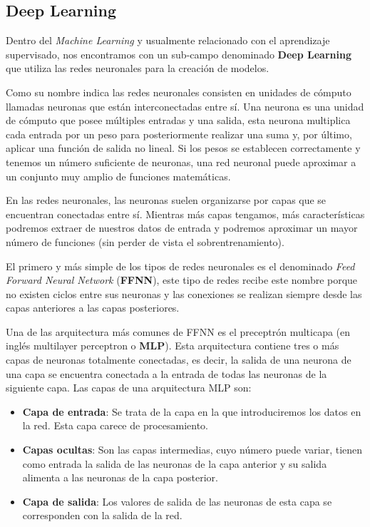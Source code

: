 \subsection{Deep Learning}
Dentro del \textit{Machine Learning} y usualmente relacionado con el aprendizaje supervisado, nos encontramos con un sub-campo denominado \textbf{Deep Learning} que utiliza las redes neuronales para la creación de modelos. 

Como su nombre indica las redes neuronales consisten en unidades de cómputo llamadas neuronas que están interconectadas entre sí. Una neurona es una unidad de cómputo que posee múltiples  entradas y una  salida, esta neurona multiplica cada entrada por un peso para posteriormente realizar una suma y, por último, aplicar una función de salida no lineal. Si los pesos se establecen correctamente y tenemos un número suficiente de neuronas, una red neuronal puede aproximar a un conjunto muy amplio de funciones matemáticas. 

En las redes neuronales, las neuronas suelen organizarse por capas que se encuentran conectadas entre sí. Mientras más capas tengamos, más características podremos extraer de nuestros datos de entrada y podremos aproximar un mayor número de funciones (sin perder de vista el sobrentrenamiento). 


El primero y más simple de los tipos de redes neuronales es el denominado \textit{Feed Forward Neural Network} (\textbf{FFNN}), este tipo de redes recibe este nombre porque no existen ciclos entre sus neuronas y las conexiones se realizan siempre desde las capas anteriores a las capas posteriores. 


Una de las arquitectura más comunes de FFNN es el preceptrón multicapa (en inglés multilayer perceptron o \textbf{MLP}). Esta arquitectura contiene tres o más capas de neuronas totalmente conectadas, es decir, la salida de una neurona de una capa se encuentra conectada a la entrada de todas las neuronas de la siguiente capa. Las capas de una arquitectura MLP son:

\begin{itemize}
	\item \textbf{Capa de entrada}: Se trata de la capa en la que introduciremos los datos en la red. Esta capa carece de procesamiento.
	\item \textbf{Capas ocultas}: Son las capas intermedias, cuyo número puede variar, tienen como entrada la salida de las neuronas de la capa anterior y su salida alimenta a las neuronas de la capa posterior.  
	\item \textbf{Capa de salida}: Los valores de salida de las neuronas de esta capa se corresponden con la salida de la red.
\end{itemize}
 
